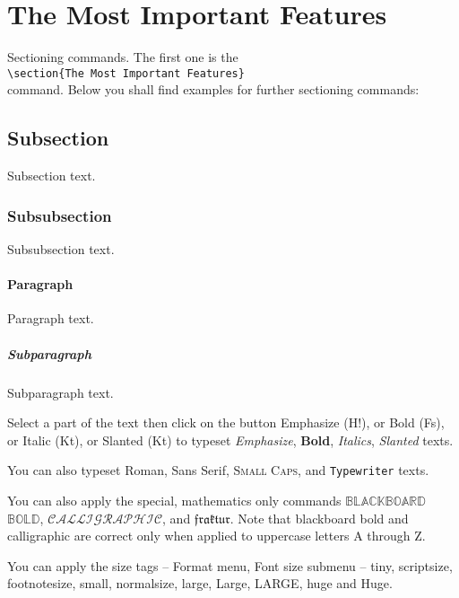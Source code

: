 \documentclass{article}%
\begin{document}
\section{The Most Important Features}

\noindent Sectioning commands. The first one is the\\
\hspace*{\fill} \verb"\section{The Most Important Features}" \hspace*{\fill}\\
command. Below you shall find examples for further sectioning commands:

\subsection{Subsection}
Subsection text.

\subsubsection{Subsubsection}
Subsubsection text.

\paragraph{Paragraph}
Paragraph text.

\subparagraph{Subparagraph}Subparagraph text.\vspace{2mm}

Select a part of the text then click on the button Emphasize (H!), or Bold (Fs), or
Italic (Kt), or Slanted (Kt) to typeset \emph{Emphasize}, \textbf{Bold},
\textit{Italics}, \textsl{Slanted} texts.

You can also typeset \textrm{Roman}, \textsf{Sans Serif}, \textsc{Small Caps}, and
\texttt{Typewriter} texts.

You can also apply the special, mathematics only commands $\mathbb{BLACKBOARD}$
$\mathbb{BOLD}$, $\mathcal{CALLIGRAPHIC}$, and $\mathfrak{fraktur}$. Note that
blackboard bold and calligraphic are correct only when applied to uppercase letters A
through Z.

You can apply the size tags -- Format menu, Font size submenu -- {\tiny tiny},
{\scriptsize scriptsize}, {\footnotesize footnotesize}, {\small small}, {\normalsize
normalsize}, {\large large}, {\Large Large}, {\LARGE LARGE}, {\huge huge} and {\Huge
Huge}.
\end{document}

